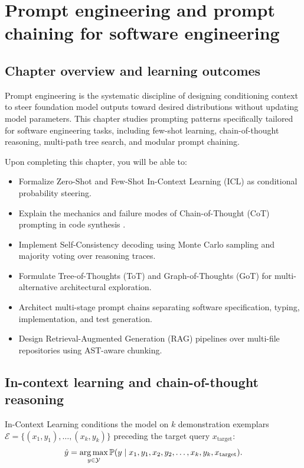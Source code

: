 \documentclass[../../main.tex]{subfiles}
\begin{document}
\chapter{Prompt engineering and prompt chaining for software engineering}
\label{ch:prompt_engineering_chaining}

\section{Chapter overview and learning outcomes}
Prompt engineering is the systematic discipline of designing conditioning context to steer foundation model outputs toward desired distributions without updating model parameters. This chapter studies prompting patterns specifically tailored for software engineering tasks, including few-shot learning, chain-of-thought reasoning, multi-path tree search, and modular prompt chaining.

Upon completing this chapter, you will be able to:
\begin{itemize}
    \item Formalize Zero-Shot and Few-Shot In-Context Learning (ICL) as conditional probability steering.
    \item Explain the mechanics and failure modes of Chain-of-Thought (CoT) prompting in code synthesis \citep{wei2022chain}.
    \item Implement Self-Consistency decoding using Monte Carlo sampling and majority voting over reasoning traces.
    \item Formulate Tree-of-Thoughts (ToT) and Graph-of-Thoughts (GoT) for multi-alternative architectural exploration.
    \item Architect multi-stage prompt chains separating software specification, typing, implementation, and test generation.
    \item Design Retrieval-Augmented Generation (RAG) pipelines over multi-file repositories using AST-aware chunking.
\end{itemize}

\section{In-context learning and chain-of-thought reasoning}
In-Context Learning conditions the model on $k$ demonstration exemplars $\mathcal{E} = \{(x_1, y_1), \dots, (x_k, y_k)\}$ preceding the target query $x_{\text{target}}$:
\begin{equation}
\hat{y} = \operatorname*{\mathrm{arg\,max}}_{y \in \mathcal{Y}} \mathbb{P}(y \mid x_1, y_1, x_2, y_2, \dots, x_k, y_k, x_{\text{target}}).
\end{equation}
\end{document}
